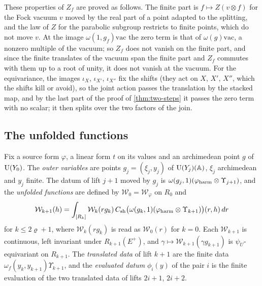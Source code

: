 These properties of $Z_f$ are proved as follows. The finite part is $f\mapsto Z(v\otimes f)$ for the Fock vacuum $v$ moved by the real part of a point adapted to the splitting, and the law of $Z$ for the parabolic subgroup restricts to finite points, which do not move $v$. At the image $\omega(1,g_f)\mathrm{vac}$ the zero
term is that of $\omega(g)\mathrm{vac}$, a nonzero multiple of the vacuum; so $Z_f$ does not vanish on the finite part, and since the finite translates of the vacuum span the finite part and $Z_f$ commutes with them up to a root of unity, it does not vanish at the vacuum. For the equivariance, the images
$\iota_X$, $\iota_{X'}$, $\iota_{X''}$ fix the shifts (they act on $X$, $X'$, $X''$, which the shifts kill or avoid), so the joint action passes the translation by the stacked map, and by the last part of the proof of \cref{thm:two-steps} it passes the zero term with no scalar; it then splits over the two factors of the join.

\subsection{The unfolded functions}\label{ss:unfolded}
Fix a source form $\varphi$, a linear form $t$ on its values and an archimedean point $g$ of $\operatorname{U}(Y_0)$. The
\emph{outer variables} are points $g_j=(\xi_j,y_j)$ of $\operatorname{U}(Y_j)(\mathbb{A})$, $\xi_j$ archimedean and $y_j$ finite. The datum of
lift $j+1$ moved by $g_j$ is $\omega(g_j,1)(\varphi_{\rm harm}\otimes\Upsilon_{j+1})$, and the \emph{unfolded functions} are
defined by
$\mathcal W_0=\mathcal W_\varphi$ on $R_0$ and
\[
  \mathcal W_{k+1}(h)=\int_{[R_k]}\mathcal W_k(r g_k)\,C_{\mathrm{sh}}\bigl(\omega(g_k,1)(\varphi_{\rm harm}\otimes\Upsilon_{k+1})\bigr)(r,h)\,dr
\]
for $k\le2\varrho+1$, where $\mathcal W_k(rg_k)$ is read as $\mathcal W_0(r)$ for $k=0$. Each $\mathcal W_{k+1}$ is continuous, left
invariant under $R_{k+1}(E^+)$, and $\gamma\mapsto\mathcal W_{k+1}(\gamma g_{k+1})$ is $\psi_U$-equivariant on $R_{k+1}$. The
\emph{translated data} of lift $k+1$ are the finite data $\omega_f(y_k,y_{k+1})\Upsilon_{k+1}$, and the \emph{evaluated datum}
$\phi_i(y)$ of the pair $i$ is the finite evaluation of the two translated data of lifts $2i+1$, $2i+2$.

